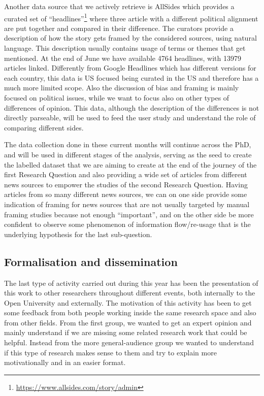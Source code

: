 Another data source that we actively retrieve is AllSides which provides a curated set of ``headlines''\footnote{\url{https://www.allsides.com/story/admin}} where three article with a different political alignment are put together and compared in their difference.
The curators provide a description of how the story gets framed by the considered sources, using natural language.
This description usually contains usage of terms or themes that get mentioned.
At the end of June we have available 4764 headlines, with 13979 articles linked.
Differently from Google Headlines which has different versions for each country, this data is US focused being curated in the US and therefore has a much more limited scope. Also the discussion of bias and framing is mainly focused on political issues, while we want to focus also on other types of differences of opinion.
This data, although the description of the differences is not directly parseable, will be used to feed the user study and understand the role of comparing different sides.



The data collection done in these current months will continue across the PhD, and will be used in different stages of the analysis, serving as the seed to create the labelled dataset that we are aiming to create at the end of the journey of the first Research Question and also providing a wide set of articles from different news sources to empower the studies of the second Research Question.
Having articles from so many different news sources, we can on one side provide some indication of framing for news sources that are not usually targeted by manual framing studies because not enough ``important'', and on the other side be more confident to observe some phenomenon of information flow/re-usage that is the underlying hypothesis for the last sub-question.

\subsection{Formalisation and dissemination}
The last type of activity carried out during this year has been the presentation of this work to other researchers throughout different events, both internally to the Open University and externally.
The motivation of this activity has been to get some feedback from both people working inside the same research space and also from other fields.
From the first group, we wanted to get an expert opinion and mainly understand if we are missing some related research work that could be helpful.
Instead from the more general-audience group we wanted to understand if this type of research makes sense to them and try to explain more motivationally and in an easier format.

